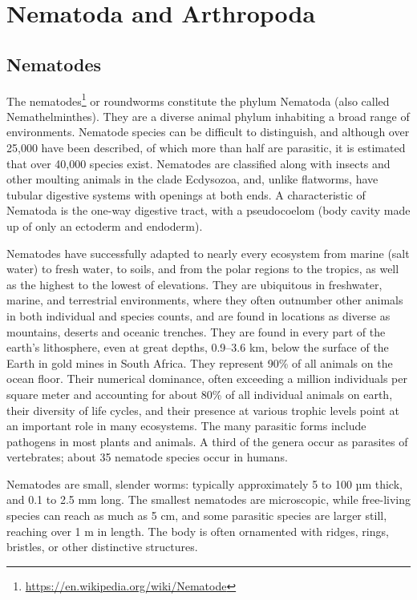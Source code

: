\documentclass[]{book}
\let\rmarkdownfootnote\footnote%
\def\footnote{\protect\rmarkdownfootnote}
\renewcommand{\href}[2]{#2\footnote{\url{#1}}}
\theoremstyle{definition}
\theoremstyle{definition}
\theoremstyle{definition}
\theoremstyle{remark}
\begin{document}
\chapter{Nematoda and Arthropoda}\label{nematoda-and-arthropoda}

\section{Nematodes}\label{nematodes}

The \href{https://en.wikipedia.org/wiki/Nematode}{nematodes} or
roundworms constitute the phylum Nematoda (also called Nemathelminthes).
They are a diverse animal phylum inhabiting a broad range of
environments. Nematode species can be difficult to distinguish, and
although over 25,000 have been described, of which more than half are
parasitic, it is estimated that over 40,000 species exist. Nematodes are
classified along with insects and other moulting animals in the clade
Ecdysozoa, and, unlike flatworms, have tubular digestive systems with
openings at both ends. A characteristic of Nematoda is the one-way
digestive tract, with a pseudocoelom (body cavity made up of only an
ectoderm and endoderm).

Nematodes have successfully adapted to nearly every ecosystem from
marine (salt water) to fresh water, to soils, and from the polar regions
to the tropics, as well as the highest to the lowest of elevations. They
are ubiquitous in freshwater, marine, and terrestrial environments,
where they often outnumber other animals in both individual and species
counts, and are found in locations as diverse as mountains, deserts and
oceanic trenches. They are found in every part of the earth's
lithosphere, even at great depths, 0.9--3.6 km, below the surface of the
Earth in gold mines in South Africa. They represent 90\% of all animals
on the ocean floor. Their numerical dominance, often exceeding a million
individuals per square meter and accounting for about 80\% of all
individual animals on earth, their diversity of life cycles, and their
presence at various trophic levels point at an important role in many
ecosystems. The many parasitic forms include pathogens in most plants
and animals. A third of the genera occur as parasites of vertebrates;
about 35 nematode species occur in humans.

Nematodes are small, slender worms: typically approximately 5 to 100 µm
thick, and 0.1 to 2.5 mm long. The smallest nematodes are microscopic,
while free-living species can reach as much as 5 cm, and some parasitic
species are larger still, reaching over 1 m in length. The body is often
ornamented with ridges, rings, bristles, or other distinctive
structures.
\end{document}
